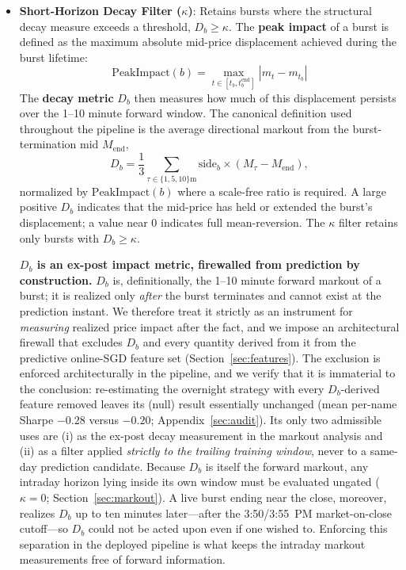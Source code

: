 \documentclass[11pt]{article}
\begin{document}
\begin{itemize}
    \item \textbf{Short-Horizon Decay Filter ($\kappa$)}: Retains bursts where the structural decay measure exceeds a threshold, $D_b \geq \kappa$. The \textbf{peak impact} of a burst is defined as the maximum absolute mid-price displacement achieved during the burst lifetime:
    \begin{equation}
    \text{PeakImpact}(b) = \max_{t \in [t_b, t_b^{\text{end}}]} |m_t - m_{t_b}|
    \end{equation}
    The \textbf{decay metric} $D_b$ then measures how much of this displacement persists over the 1--10 minute forward window. The canonical definition used throughout the pipeline is the average directional markout from the burst-termination mid $M_{\text{end}}$,
    \begin{equation}
    D_b = \frac{1}{3}\sum_{\tau\in\{1,5,10\}\text{m}} \text{side}_b \times (M_{\tau} - M_{\text{end}}),
    \label{eq:db}
    \end{equation}
    normalized by $\text{PeakImpact}(b)$ where a scale-free ratio is required. A large positive $D_b$ indicates that the mid-price has held or extended the burst's displacement; a value near 0 indicates full mean-reversion. The $\kappa$ filter retains only bursts with $D_b\ge\kappa$.

    \textbf{$D_b$ is an ex-post impact metric, firewalled from prediction by construction.} $D_b$ is, definitionally, the 1--10 minute forward markout of a burst; it is realized only \emph{after} the burst terminates and cannot exist at the prediction instant. We therefore treat it strictly as an instrument for \emph{measuring} realized price impact after the fact, and we impose an architectural firewall that excludes $D_b$ and every quantity derived from it from the predictive online-SGD feature set (Section~\ref{sec:features}). The exclusion is enforced architecturally in the pipeline, and we verify that it is immaterial to the conclusion: re-estimating the overnight strategy with every $D_b$-derived feature removed leaves its (null) result essentially unchanged (mean per-name Sharpe $-0.28$ versus $-0.20$; Appendix~\ref{sec:audit}). Its only two admissible uses are (i) as the ex-post decay measurement in the markout analysis and (ii) as a filter applied \emph{strictly to the trailing training window}, never to a same-day prediction candidate. Because $D_b$ is itself the forward markout, any intraday horizon lying inside its own window must be evaluated ungated ($\kappa=0$; Section~\ref{sec:markout}). A live burst ending near the close, moreover, realizes $D_b$ up to ten minutes later---after the 3:50/3:55~PM market-on-close cutoff---so $D_b$ could not be acted upon even if one wished to. Enforcing this separation in the deployed pipeline is what keeps the intraday markout measurements free of forward information.
\end{itemize}
\end{document}
